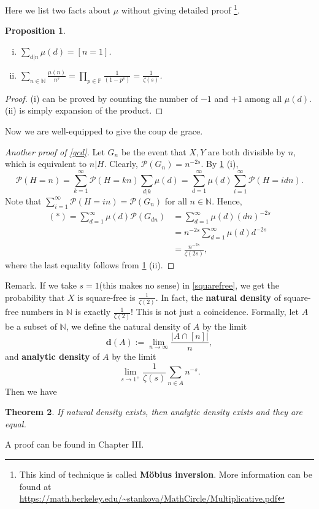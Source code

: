 \documentclass[12pt]{article}
\newtheorem{theorem}{Theorem}
\newtheorem{proposition}[theorem]{Proposition}
\newcommand\N{\mathbb{N}}
\newcommand\pp{\mathcal{P}}
\newcommand\PP{\mathbb{P}}
\begin{document}
Here we list two facts about $\mu$ without giving detailed proof
\footnote{This kind of technique is called \textbf{Möbius inversion}.
More information can be found at 
\url{https://math.berkeley.edu/~stankova/MathCircle/Multiplicative.pdf}}.
\begin{proposition} \label{mu} 
    \begin{enumerate}[(i)]
        \item $\sum_{d|n} \mu(d) = [n = 1]$.
        \item $\sum_{n \in \N} \frac{\mu(n)}{n^s} 
        = \prod_{p \in \PP} \frac{1}{(1 - p^{s})} = \frac{1}{\zeta(s)}$.
    \end{enumerate}
\end{proposition} 
\begin{proof}
    (i) can be proved by counting the number of $-1$ and $+1$
    among all $\mu(d)$. (ii) is simply expansion of the product.
\end{proof}

Now we are well-equipped to give the coup de grace. 
\begin{proof}[Another proof of \cref{gcd}]
    Let $G_n$ be the event that $X,Y$ are both divisible by $n$,
    which is equivalent to $n | H$.
    Clearly, $\pp(G_n) = n^{-2s}$.
    By \cref{mu} (i), 
    \begin{equation}
        \tag{*}
        \pp(H = n) = \sum_{k = 1}^\infty \pp(H = kn) \sum_{d | k} \mu(d) 
        = \sum_{d = 1}^{\infty} \mu(d) \sum_{i = 1}^{\infty} \pp(H = idn).    
    \end{equation}
    Note that $\sum_{i = 1}^{\infty} \pp(H = in) = \pp(G_n)$ for all $n \in \N$.
    Hence, 
    \begin{align*}
        (*) = \sum_{d = 1}^{\infty} \mu(d) \pp(G_{dn}) 
        &= \sum_{d = 1}^{\infty} \mu(d) (dn)^{-2s} \\
        &= n^{-2s} \sum_{d = 1}^{\infty}  \mu(d) d^{-2s} \\
        &= \frac{n^{-2s}}{\zeta(2s)},
    \end{align*}
    where the last equality follows from \cref{mu} (ii).
\end{proof}

\begin{paragraph}{Remark.}
    If we take $s = 1$(this makes no sense) in \cref{squarefree}, we get 
    the probability that $X$ is square-free is $\frac{1}{\zeta(2)}$.
    In fact, the \textbf{natural density} of square-free numbers in $\N$ 
    is exactly $\frac{1}{\zeta(2)}$! This is not just a coincidence. 
    Formally, let $A$ be a subset of $\N$, 
    we define the natural density of $A$ by the limit
    $$
        \bm{d}(A) := \lim_{n \to \infty}\frac{|A \cap [n]|}{n},
    $$    
    and \textbf{analytic density} of $A$
    by the limit
    $$
        \lim_{s \to 1^{+}} \frac{1}{\zeta(s)} \sum_{n \in A} n^{-s}.
    $$
    Then we have 
    \begin{theorem}
        If natural density exists, then analytic density exists and they are equal.
    \end{theorem}
    A proof can be found in \cite{tenenbaum2015introduction} Chapter III.
\end{paragraph}



\end{document}
